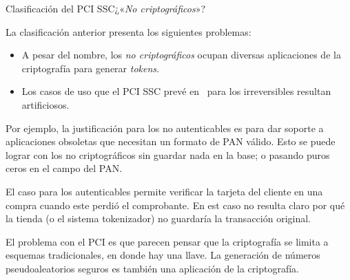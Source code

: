 \begin{frame}{Clasificación del PCI SSC}{¿«\textit{No criptográficos}»?}

  La clasificación anterior presenta los siguientes problemas:

  \begin{itemize}
    \item<1-> A pesar del nombre, los \textit{no criptográficos} ocupan
      diversas aplicaciones de la criptografía para generar \textit{tokens}.
    \item<2-> Los casos de uso que el PCI SSC prevé en~\cite{pci_tokens} para
      los irreversibles resultan artificiosos.
  \end{itemize}

  {
    Por ejemplo, la justificación para los no autenticables es para dar
    soporte a aplicaciones obsoletas que necesitan un formato de PAN
    válido. Esto se puede lograr con los no criptográficos sin guardar
    nada en la base; o pasando puros ceros en el campo del PAN.

    El caso para los autenticables permite verificar la tarjeta del cliente
    en una compra cuando este perdió el comprobante. En est caso no resulta
    claro por qué la tienda (o el sistema tokenizador) no guardaría
    la transacción original.
  }

  {
    El problema con el PCI es que parecen pensar que la criptografía se
    limita a esquemas tradicionales, en donde hay una llave. La
    generación de números pseudoaleatorios seguros es también una
    aplicación de la criptografía.
  }

\end{frame}

